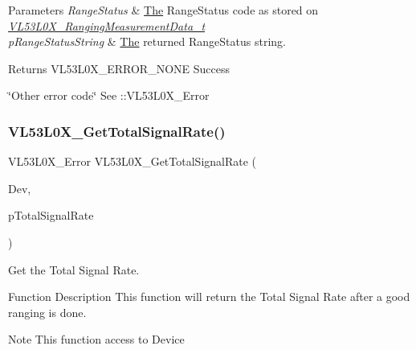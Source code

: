\begin{DoxyParams}{Parameters}
{\em Range\+Status} & \hyperlink{structThe}{The} Range\+Status code as stored on {\itshape \hyperlink{structVL53L0X__RangingMeasurementData__t}{V\+L53\+L0\+X\+\_\+\+Ranging\+Measurement\+Data\+\_\+t}} \\
\hline
{\em p\+Range\+Status\+String} & \hyperlink{structThe}{The} returned Range\+Status string. \\
\hline
\end{DoxyParams}
\begin{DoxyReturn}{Returns}
V\+L53\+L0\+X\+\_\+\+E\+R\+R\+O\+R\+\_\+\+N\+O\+NE Success 

\char`\"{}\+Other error code\char`\"{} See \+::\+V\+L53\+L0\+X\+\_\+\+Error 
\end{DoxyReturn}
\mbox{\label{group__VL53L0X__general__group_gaee98657af1e74394c5e3fc4d4b383dbf}} 
\subsubsection{\texorpdfstring{V\+L53\+L0\+X\+\_\+\+Get\+Total\+Signal\+Rate()}{VL53L0X\_GetTotalSignalRate()}}
{\footnotesize\ttfamily V\+L53\+L0\+X\+\_\+\+Error V\+L53\+L0\+X\+\_\+\+Get\+Total\+Signal\+Rate (\begin{DoxyParamCaption}\item[{\hyperlink{group__VL53L0X__platform__group_ga2d6405308b1dd524b462f1b8fb97d167}{V\+L53\+L0\+X\+\_\+\+D\+EV}}]{Dev,  }\item[{\hyperlink{vl53l0x__types_8h_afb910790161809fc76e1a274a6349384}{Fix\+Point1616\+\_\+t} $\ast$}]{p\+Total\+Signal\+Rate }\end{DoxyParamCaption})}



Get the Total Signal Rate. 

\begin{DoxyParagraph}{Function Description}
This function will return the Total Signal Rate after a good ranging is done.
\end{DoxyParagraph}
\begin{DoxyNote}{Note}
This function access to Device
\end{DoxyNote}

